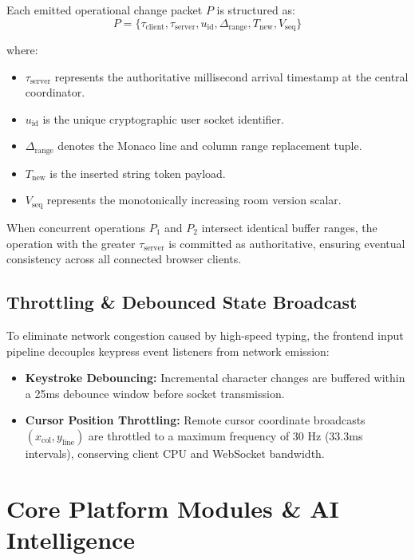 \documentclass[12pt,a4paper]{report}
\begin{document}
Each emitted operational change packet $P$ is structured as:
\begin{equation}
P = \{ \tau_{\text{client}}, \tau_{\text{server}}, u_{\text{id}}, \Delta_{\text{range}}, T_{\text{new}}, V_{\text{seq}} \}
\end{equation}

where:
\begin{itemize}
    \item $\tau_{\text{server}}$ represents the authoritative millisecond arrival timestamp at the central coordinator.
    \item $u_{\text{id}}$ is the unique cryptographic user socket identifier.
    \item $\Delta_{\text{range}}$ denotes the Monaco line and column range replacement tuple.
    \item $T_{\text{new}}$ is the inserted string token payload.
    \item $V_{\text{seq}}$ represents the monotonically increasing room version scalar.
\end{itemize}

When concurrent operations $P_1$ and $P_2$ intersect identical buffer ranges, the operation with the greater $\tau_{\text{server}}$ is committed as authoritative, ensuring eventual consistency across all connected browser clients.

\section{Throttling \& Debounced State Broadcast}
To eliminate network congestion caused by high-speed typing, the frontend input pipeline decouples keypress event listeners from network emission:
\begin{itemize}
    \item \textbf{Keystroke Debouncing:} Incremental character changes are buffered within a 25ms debounce window before socket transmission.
    \item \textbf{Cursor Position Throttling:} Remote cursor coordinate broadcasts $(x_{\text{col}}, y_{\text{line}})$ are throttled to a maximum frequency of 30 Hz (33.3ms intervals), conserving client CPU and WebSocket bandwidth.
\end{itemize}

\chapter{Core Platform Modules \& AI Intelligence}
\end{document}
